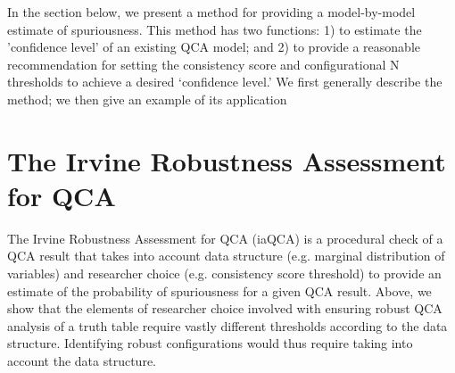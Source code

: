 \documentclass[]{article}
\begin{document}
{In the section below, we present a method for providing a model-by-model estimate of spuriousness. This method has two functions: 1) to estimate the 'confidence level' of an existing QCA model; and 2) to provide a reasonable recommendation for setting the consistency score and configurational N thresholds to achieve a desired `confidence level.' We first generally describe the method; we then give an example of its application 


\section{The Irvine Robustness Assessment for QCA}

The Irvine Robustness Assessment for QCA (iaQCA) is a procedural check of a QCA result that takes into account data structure (e.g. marginal distribution of variables) and researcher choice (e.g. consistency score threshold) to provide an estimate of the probability of spuriousness for a given QCA result. 
Above, we show that the elements of researcher choice involved with ensuring robust QCA analysis of a truth table require vastly different thresholds according to the data structure. Identifying robust configurations would thus require taking into account the data structure.

}
\end{document}
